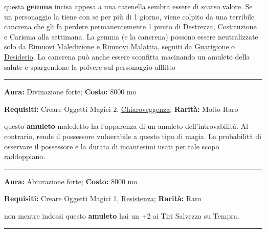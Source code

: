 \begin{multicols}{2}
questa \textbf{gemma} incisa appesa a una catenella sembra essere di scarso valore. Se un personaggio la tiene con se per più di 1 giorno, viene colpito da una terribile cancrena che gli fa perdere permanentemente 1 punto di Destrezza, Costituzione e Carisma alla settimana. La gemma (e la cancrena) possono essere neutralizzate solo da \hyperlink{Rimuovi Maledizione}{Rimuovi Maledizione} e \hyperlink{Rimuovi Malattia}{Rimuovi Malattia}, seguiti da \hyperlink{BastonedellaGuarigione}{Guarigione} o \hyperlink{Desiderio}{Desiderio}. La cancrena può anche essere sconfitta macinando un amuleto della salute e spargendone la polvere sul personaggio afflitto

\smallskip\noindent\rule{\linewidth}{2pt}  \hypertarget{AmuletodellaLocalizzazioneinevitabile}{}\smallskip{}\noindent\label{AmuletodellaLocalizzazioneinevitabile}

\textbf{Aura:} Divinazione forte; \textbf{Costo:} 8000 mo

\textbf{Requisiti:} Creare Oggetti Magici 2, \hyperlink{PozionedellaChiaroveggenzaanimale}{Chiaroveggenza}; \textbf{Rarità:} Molto Raro

questo \textbf{amuleto} maledetto ha l'apparenza di un amuleto dell'introvabilità. Al contrario, rende il possessore vulnerabile a questo tipo di magia. La probabilità di osservare il possessore e la durata di incantesimi usati per tale scopo raddoppiano.

\smallskip\noindent\rule{\linewidth}{2pt}  \hypertarget{AmuletodellaResistenzaFisica}{}\smallskip{}\noindent\label{AmuletodellaResistenzaFisica}

\textbf{Aura:} Abiurazione forte; \textbf{Costo:} 8000 mo

\textbf{Requisiti:} Creare Oggetti Magici 1, \hyperlink{ResistenzaalVeleno}{Resistenza}; \textbf{Rarità:} Raro

non mentre indossi questo \textbf{amuleto} hai un +2 ai Tiri Salvezza su Tempra.

\smallskip\noindent\rule{\linewidth}{2pt}  \hypertarget{AmuletodiProtezionedallaIndividuazioneeLocalizzazione}{}\smallskip{}\noindent\label{AmuletodiProtezionedallaIndividuazioneeLocalizzazione}


\end{multicols}
